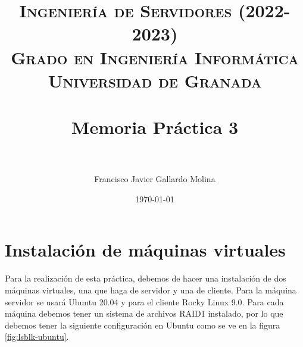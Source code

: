 
\usepackage{blindtext}
\usepackage{hyperref}
\usepackage{listings}
\usepackage{graphicx}
\graphicspath{ {images/} }

\title{	
\normalfont \normalsize 
\textsc{\textbf{Ingeniería de Servidores (2022-2023)} \\ Grado en Ingeniería Informática \\ Universidad de Granada} \\ [25pt] %
\horrule{0.5pt} \\[0.4cm] %
\huge Memoria Práctica 3 \\ %
\horrule{2pt} \\[0.5cm] %
}

\author{Francisco Javier Gallardo Molina} %

\date{\normalsize\today} %

\renewcommand{\footrulewidth}{0.4pt}
\rfoot[]{\thepage}



\maketitle

\newpage

\horrule{1pt}
\tableofcontents

\newpage

\section{Instalación de máquinas virtuales}

Para la realización de esta práctica, debemos de hacer una instalación de dos máquinas virtuales, una que haga de servidor y una de cliente. Para la máquina servidor se usará Ubuntu 20.04 y para el cliente Rocky Linux 9.0. Para cada máquina debemos tener un sistema de archivos RAID1 instalado, por lo que debemos tener la siguiente configuración en Ubuntu como se ve en la figura \ref{fig:lsblk-ubuntu}.

